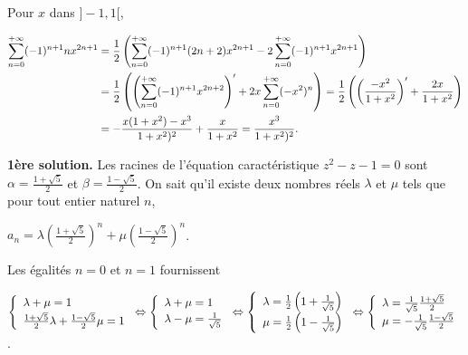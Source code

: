 {{Pour $x$ dans $]-1,1[$,

\begin{align*}\ensuremath
\sum_{n=0}^{+\infty}(-1)^{n+1}nx^{2n+1}&=\frac{1}{2}\left(\sum_{n=0}^{+\infty}(-1)^{n+1}(2n+2)x^{2n+1}-2\sum_{n=0}^{+\infty}(-1)^{n+1}x^{2n+1}\right)\\ 
 &=\frac{1}{2}\left(\left(\sum_{n=0}^{+\infty}(-1)^{n+1}x^{2n+2}\right)'+2x\sum_{n=0}^{+\infty}(-x^2)^n\right)=\frac{1}{2}\left(\left(\frac{-x^2}{1+x^2}\right)'+\frac{2x}{1+x^2}\right)\\
 &= -\frac{x(1+x^2)-x^3}{1+x^2)^2}+\frac{x}{1+x^2}=\frac{x^3}{1+x^2)^2}.
\end{align*}

\begin{center}
\shadowbox{
$\forall x\in]-1,1[$, $\sum_{n=0}^{+\infty}(-1)^{n+1}nx^{2n+1}=\frac{x^3}{1+x^2)^2}$.
}
\end{center}
\textbf{1ère solution.} Les racines de l'équation caractéristique $z^2 - z - 1 = 0$ sont $\alpha=\frac{1+\sqrt{5}}{2}$ et $\beta=\frac{1-\sqrt{5}}{2}$. On sait qu'il existe deux nombres réels $\lambda$ et $\mu$ tels que pour tout entier naturel $n$,

\begin{center}
$a_n =\lambda\left(\frac{1+\sqrt{5}}{2}\right)^n+\mu\left(\frac{1-\sqrt{5}}{2}\right)^n$.
\end{center}

Les égalités $n=0$ et $n=1$ fournissent

\begin{center}
$\left\{
\begin{array}{l}
\rule[-2mm]{0mm}{0mm}\lambda+\mu=1\\
\frac{1+\sqrt{5}}{2}\lambda+\frac{1-\sqrt{5}}{2}\mu=1
\end{array}
\right.\Leftrightarrow\left\{
\begin{array}{l}
\rule[-2mm]{0mm}{0mm}\lambda+\mu=1\\
\lambda-\mu=\frac{1}{\sqrt{5}}
\end{array}
\right.\Leftrightarrow
\left\{
\begin{array}{l}
\lambda=\frac{1}{2}\left(1+\frac{1}{\sqrt{5}}\right)\\
\mu=\frac{1}{2}\left(1-\frac{1}{\sqrt{5}}\right)\end{array}
\right.\Leftrightarrow\left\{
\begin{array}{l}
\lambda=\frac{1}{\sqrt{5}}\frac{1+\sqrt{5}}{2}\\
\mu=-\frac{1}{\sqrt{5}}\frac{1-\sqrt{5}}{2}
\end{array}
\right.$.
\end{center}

}}
